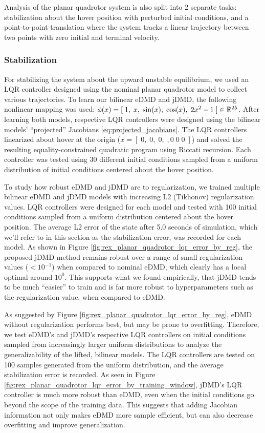 \documentclass{article}
\begin{document}
Analysis of the planar quadrotor system is also split into 2 separate tasks: stabilization
about the hover position with perturbed initial conditions, and a point-to-point translation
where the system tracks a linear trajectory between two points with zero initial and 
terminal velocity.

\subsubsection{Stabilization}

For stabilizing the system about the upward unstable equilibrium, we used an LQR controller
designed using the nominal planar quadrotor model to collect various trajectories. To learn
our bilinear eDMD and jDMD, the following nonlinear mapping was used: $\phi(x) = [\; 1,\;
x,\; \sin(x),\; \cos(x),\; 2x^{2}-1\; ] \in \mathbb{R}^{25}$. After learning both models, respective
LQR controllers were designed using the bilinear models' ``projected'' Jacobians
\eqref{eq:projected_jacobians}. The LQR controllers linearized about hover at the origin ($x
= [\;0,\; 0,\; 0,\;, 0\;  0\;  0\;]$) and solved the resulting equality-constrained
quadratic program using Riccati recursion. Each controller was tested using 30 different
initial conditions sampled from a uniform distribution of initial conditions centered about
the hover position.

To study how robust eDMD and jDMD are to regularization, we trained multiple bilinear eDMD
and jDMD models with increasing L2 (Tikhonov) regularization values. LQR controllers were
designed for each model and tested with 100 initial conditions sampled from a uniform
distribution centered about the hover position. The average L2 error of the state after 5.0
seconds of simulation, which we'll refer to in this section as the stabilization error, was
recorded for each model. As shown in Figure
\ref{fig:rex_planar_quadrotor_lqr_error_by_reg}, the proposed jDMD method remains robust
over a range of small regularization values ($<10^{-1}$) when compared to nominal eDMD, which 
clearly has a local optimal around $10^0$. This supports what we found empirically, that 
jDMD tends to be much ``easier'' to train and is far more robust to hyperparameters such as 
the regularization value, when compared to eDMD.

As suggested by Figure \ref{fig:rex_planar_quadrotor_lqr_error_by_reg}, eDMD without
regularization performs best, but may be prone to overfitting. Therefore, we test eDMD's and
jDMD's respective LQR controllers on initial conditions sampled from increasingly larger
uniform distributions to analyze the generalizability of the lifted, bilinear models. The
LQR controllers are tested on 100 samples generated from the uniform distribution, and the
average stabilization error is recorded. As seen in Figure
\ref{fig:rex_planar_quadrotor_lqr_error_by_training_window}, jDMD's LQR controller is much
more robust than eDMD, even when the initial conditions go beyond the scope of the training
data. This suggests that adding Jacobian information not only makes eDMD more sample
efficient, but can also decrease overfitting and improve generalization. 
\end{document}
